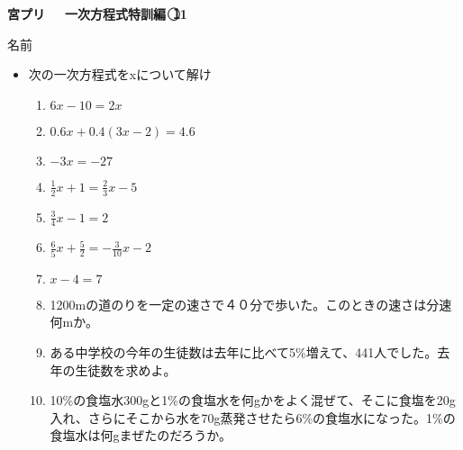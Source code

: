\documentclass[a4paper,fleqn,papersize,15pt]{jsarticle}
\begin{document}
 \begin{center}
   \LARGE\textbf{宮プリ　~一次方程式特訓編~\textcircled{\scriptsize 11}}
     \begin{flushright}
       名前\underline{\hspace{8zw}}
     \end{flushright}
 \end{center}

 \begin{itemize}
   \item 次の一次方程式をxについて解け
   \begin{enumerate}
\item $6x-10=2x$ \begin{flushright}\framebox[8em]{\rule{0pt}{6ex}}\end{flushright} %
\item $0.6x+0.4(3x-2)=4.6$ \begin{flushright}\framebox[8em]{\rule{0pt}{6ex}}\end{flushright} %
\item $-3x=-27$ \begin{flushright}\framebox[8em]{\rule{0pt}{6ex}}\end{flushright} %
\item $\frac{1}{2} x+1= \frac{2}{3} x-5$ \begin{flushright}\framebox[8em]{\rule{0pt}{6ex}}\end{flushright} %
\item $\frac{3}{4} x-1=2$ \begin{flushright}\framebox[8em]{\rule{0pt}{6ex}}\end{flushright} %
\item $\frac{6}{5} x+ \frac{5}{2} =- \frac{3}{10} x-2$ \begin{flushright}\framebox[8em]{\rule{0pt}{6ex}}\end{flushright} %
\item $x-4=7$ \begin{flushright}\framebox[8em]{\rule{0pt}{6ex}}\end{flushright} %
\item 1200mの道のりを一定の速さで４０分で歩いた。このときの速さは分速何mか。 \vfill \begin{flushright}\framebox[8em]{\rule{0pt}{6ex}}\end{flushright} %
\item ある中学校の今年の生徒数は去年に比べて5\%増えて、441人でした。去年の生徒数を求めよ。 \vfill \begin{flushright}\framebox[8em]{\rule{0pt}{6ex}}\end{flushright} %
\item 10\%の食塩水300gと1\%の食塩水を何gかをよく混ぜて、そこに食塩を20g入れ、さらにそこから水を70g蒸発させたら6\%の食塩水になった。1\%の食塩水は何gまぜたのだろうか。 \vfill \begin{flushright}\framebox[8em]{\rule{0pt}{6ex}}\end{flushright} %
\end{enumerate}
    \vfill
\end{itemize}
\end{document}
